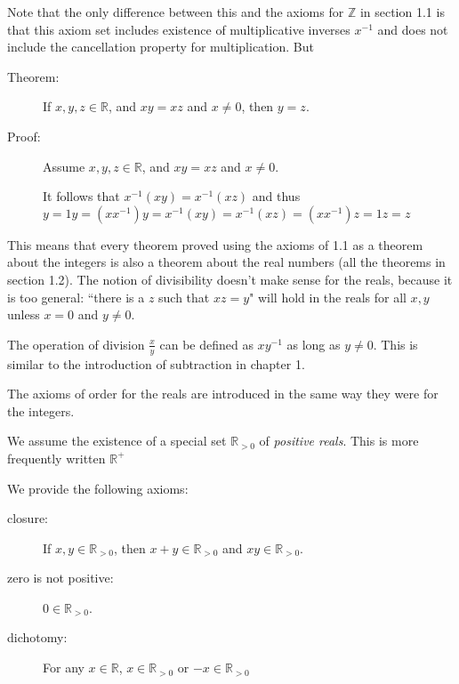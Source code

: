 \documentclass[12pt]{article}
\begin{document}
Note that the only difference between this and the axioms for $\mathbb Z$ in section 1.1 is that this axiom set includes existence of multiplicative inverses $x^{-1}$ and does not include the cancellation property for multiplication.  But

\begin{description}

\item[Theorem:]  If $x,y,z \in \mathbb R$, and $xy = xz$ and $x \neq 0$, then $y=z$.

\item[Proof:]  Assume $x,y,z \in \mathbb R$, and $xy = xz$ and $x \neq 0$.

It follows that $x^{-1}(xy) = x^{-1}(xz)$ and thus $y = 1y = (xx^{-1})y = x^{-1}(xy) = x^{-1}(xz) = (xx^{-1})z = 1z = z$

\end{description}

This means that every theorem proved using the axioms of 1.1 as a theorem about the integers is also a theorem about the real numbers (all the theorems in section 1.2).  The notion of divisibility doesn't make sense for the reals, because it is too general:  ``there is a $z$ such that $xz=y$"  will hold in the reals for all $x,y$ unless $x = 0$ and $y \neq 0$.

The operation of division $\frac xy$ can be defined as $xy^{-1}$ as long as $y \neq 0$.  This is similar to the introduction of subtraction in chapter 1.

The axioms of order for the reals are introduced in the same way they were for the integers.

We assume the existence of a special set $\mathbb R_{>0}$ of {\em positive reals\/}.  This is more frequently written ${\mathbb R}^+$

We provide the following axioms:

\begin{description}

\item[closure:]  If $x,y \in \mathbb R_{>0}$, then $x+y \in \mathbb R_{>0}$ and $xy \in \mathbb R_{>0}$.

\item[zero is not positive:]  $0 \in \mathbb R_{>0}$.

\item[dichotomy:]  For any $x \in \mathbb R$, $x \in {\mathbb R}_{>0}$  or $-x \in {\mathbb R}_{>0}$

\end{description}
\end{document}
